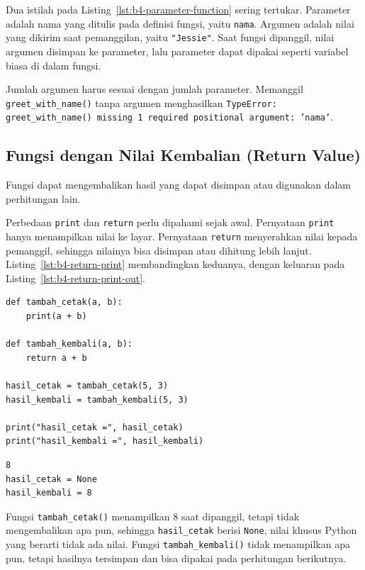 Dua istilah pada Listing~\ref{lst:b4-parameter-function} sering tertukar. Parameter adalah nama yang ditulis pada definisi fungsi, yaitu \texttt{nama}. Argumen adalah nilai yang dikirim saat pemanggilan, yaitu \texttt{"Jessie"}. Saat fungsi dipanggil, nilai argumen disimpan ke parameter, lalu parameter dapat dipakai seperti variabel biasa di dalam fungsi.

Jumlah argumen harus sesuai dengan jumlah parameter. Memanggil \texttt{greet_with_name()} tanpa argumen menghasilkan \texttt{TypeError: greet_with_name() missing 1 required positional argument: 'nama'}.

\subsection{Fungsi dengan Nilai Kembalian (Return Value)}

Fungsi dapat mengembalikan hasil yang dapat disimpan atau digunakan dalam perhitungan lain.

Perbedaan \texttt{print} dan \texttt{return} perlu dipahami sejak awal. Pernyataan \texttt{print} hanya menampilkan nilai ke layar. Pernyataan \texttt{return} menyerahkan nilai kepada pemanggil, sehingga nilainya bisa disimpan atau dihitung lebih lanjut. Listing~\ref{lst:b4-return-print} membandingkan keduanya, dengan keluaran pada Listing~\ref{lst:b4-return-print-out}.

\begin{lstlisting}[style=PythonStyle, caption={Kode Python: return_vs_print.py}, label={lst:b4-return-print}]
def tambah_cetak(a, b):
    print(a + b)

def tambah_kembali(a, b):
    return a + b

hasil_cetak = tambah_cetak(5, 3)
hasil_kembali = tambah_kembali(5, 3)

print("hasil_cetak =", hasil_cetak)
print("hasil_kembali =", hasil_kembali)
\end{lstlisting}

\begin{lstlisting}[language=bash, caption={Keluaran return_vs_print.py}, label={lst:b4-return-print-out}]
8
hasil_cetak = None
hasil_kembali = 8
\end{lstlisting}

Fungsi \texttt{tambah_cetak()} menampilkan 8 saat dipanggil, tetapi tidak mengembalikan apa pun, sehingga \texttt{hasil_cetak} berisi \texttt{None}, nilai khusus Python yang berarti tidak ada nilai. Fungsi \texttt{tambah_kembali()} tidak menampilkan apa pun, tetapi hasilnya tersimpan dan bisa dipakai pada perhitungan berikutnya.

